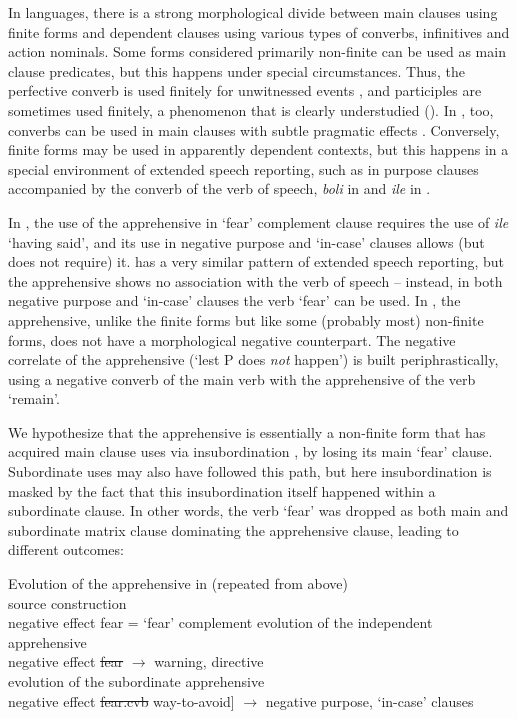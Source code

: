 \documentclass[output=paper,colorlinks,citecolor=brown]{langscibook}
\begin{document}
In  languages, there is a strong morphological divide between main clauses using finite forms and dependent clauses using various types of converbs, infinitives and action nominals. Some forms considered primarily non-finite can be used as main clause predicates, but this happens under special circumstances. Thus, the perfective converb is used finitely for unwitnessed  events \citep{Kibrik1977}, and participles are sometimes used finitely, a phenomenon that is clearly understudied (\citealt{KalininaSumbatova2007,Kalinina2011}). In , too, converbs can be used in main clauses with subtle pragmatic effects \citep{Kustova2019}. Conversely, finite forms may be used in apparently dependent contexts, but this happens in a special environment of extended speech reporting, such as in purpose clauses accompanied by the converb of the verb of speech, \textit{boli} in  and \textit{ile} in .  

In , the use of the apprehensive in `fear' complement clause requires the use of \textit{ile} `having said', and its use in negative purpose and `in-case' clauses allows (but does not require) it.  has a very similar pattern of extended speech reporting, but the apprehensive shows no association with the verb of speech -- instead, in both negative purpose and `in-case' clauses the verb `fear' can be used. In , the apprehensive, unlike the finite forms but like some (probably most) non-finite forms, does not have a morphological negative counterpart. The negative correlate of the apprehensive (`lest P does \textit{not} happen') is built periphrastically, using a negative converb of the main verb with the apprehensive of the verb `remain'. 

We hypothesize that the  apprehensive is essentially a non-finite form that has acquired main clause uses via insubordination \citep{evans2007insubordination}, by losing its main `fear' clause. Subordinate uses may also have followed this path, but here insubordination is masked by the fact that this insubordination itself happened within a subordinate clause. In other words, the verb `fear' was dropped as both main and subordinate matrix clause dominating the apprehensive clause, leading to different outcomes:

\ea \label{ex:DD79} \textnormal{Evolution of the apprehensive in  (repeated from  above)} \\
\ea \label{ex:DD79a} \textnormal{source construction} \\
\textnormal{{\ob\ob}negative effect{\cb} fear{\cb} = `fear' complement}
\ex \label{ex:DD79b} \textnormal{evolution of the independent apprehensive} \\
\textnormal{{\ob\ob}negative effect{\cb} \sout{fear}{\cb} $\rightarrow$ warning, directive}  \\
\ex \label{ex:DD79c} \textnormal{evolution of the subordinate apprehensive} \\
\textnormal{{\ob\ob\ob}negative effect{\cb} \sout{fear.cvb}{\cb} way-to-avoid] $\rightarrow$ negative purpose, `in-case' clauses} \\
\z
\z
\end{document}
